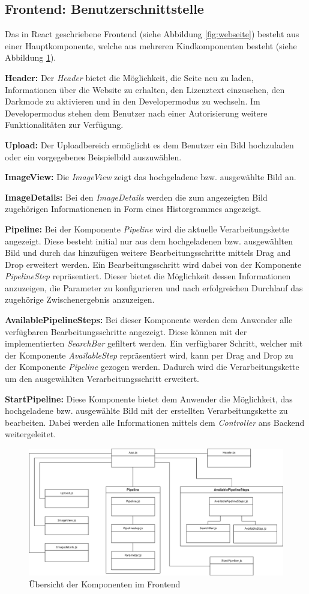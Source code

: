 \subsection{Frontend: Benutzerschnittstelle}
Das in React geschriebene Frontend (siehe Abbildung \ref{fig:webseite}) besteht aus einer Hauptkomponente, welche aus mehreren Kindkomponenten besteht (siehe Abbildung \ref{fig:frontend}).

\textbf{Header:} Der \textit{Header} bietet die Möglichkeit, die Seite neu zu laden, Informationen über die Website zu erhalten, den Lizenztext einzusehen, den Darkmode zu aktivieren und in den Developermodus zu wechseln. Im Developermodus stehen dem Benutzer nach einer Autorisierung weitere Funktionalitäten zur Verfügung.

\textbf{Upload:} Der Uploadbereich ermöglicht es dem Benutzer ein Bild hochzuladen oder ein vorgegebenes Beispielbild auszuwählen.

\textbf{ImageView:} Die \textit{ImageView} zeigt das hochgeladene bzw. ausgewählte Bild an.

\textbf{ImageDetails:} Bei den \textit{ImageDetails} werden die zum angezeigten Bild zugehörigen Informationenen in Form eines Historgrammes angezeigt.

\textbf{Pipeline:} Bei der Komponente \textit{Pipeline} wird die aktuelle Verarbeitungskette angezeigt. Diese besteht initial nur aus dem hochgeladenen bzw. ausgewählten Bild und durch das hinzufügen weitere Bearbeitungsschritte mittels Drag and Drop erweitert werden. Ein Bearbeitungsschritt wird dabei von der Komponente \textit{PipelineStep} repräsentiert. Dieser bietet die Möglichkeit dessen Informationen anzuzeigen, die Parameter zu konfigurieren und nach erfolgreichen Durchlauf das zugehörige Zwischenergebnis anzuzeigen.

\textbf{AvailablePipelineSteps:} Bei dieser Komponente werden dem Anwender alle verfügbaren Bearbeitungsschritte angezeigt. Diese können mit der implementierten \textit{SearchBar} gefiltert werden. Ein verfügbarer Schritt, welcher mit der Komponente \textit{AvailableStep} repräsentiert wird, kann per Drag and Drop zu der Komponente \textit{Pipeline} gezogen werden. Dadurch wird die Verarbeitungskette um den ausgewählten Verarbeitungsschritt erweitert.

\textbf{StartPipeline:} Diese Komponente bietet dem Anwender die Möglichkeit, das hochgeladene bzw. ausgewählte Bild mit der erstellten Verarbeitungskette zu bearbeiten. Dabei werden alle Informationen mittels dem \textit{Controller} ans Backend weitergeleitet.

\begin{figure}[ht]
    \centering
    \includegraphics[width=\textwidth]{Bilder/FrontendBDCC.drawio.png}
    \caption{Übersicht der Komponenten im Frontend}
    \label{fig:frontend}
\end{figure}